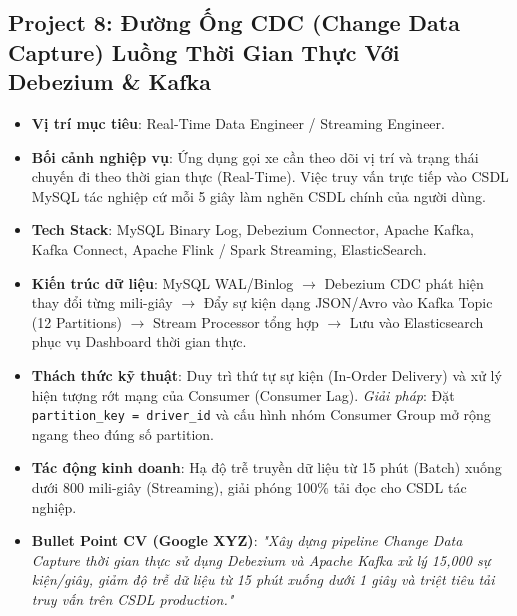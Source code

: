 \subsection{Project 8: Đường Ống CDC (Change Data Capture) Luồng Thời Gian Thực Với Debezium \& Kafka}
\begin{itemize}
    \item \textbf{Vị trí mục tiêu}: Real-Time Data Engineer / Streaming Engineer.
    \item \textbf{Bối cảnh nghiệp vụ}: Ứng dụng gọi xe cần theo dõi vị trí và trạng thái chuyến đi theo thời gian thực (Real-Time). Việc truy vấn trực tiếp vào CSDL MySQL tác nghiệp cứ mỗi 5 giây làm nghẽn CSDL chính của người dùng.
    \item \textbf{Tech Stack}: MySQL Binary Log, Debezium Connector, Apache Kafka, Kafka Connect, Apache Flink / Spark Streaming, ElasticSearch.
    \item \textbf{Kiến trúc dữ liệu}: MySQL WAL/Binlog $\rightarrow$ Debezium CDC phát hiện thay đổi từng mili-giây $\rightarrow$ Đẩy sự kiện dạng JSON/Avro vào Kafka Topic (12 Partitions) $\rightarrow$ Stream Processor tổng hợp $\rightarrow$ Lưu vào Elasticsearch phục vụ Dashboard thời gian thực.
    \item \textbf{Thách thức kỹ thuật}: Duy trì thứ tự sự kiện (In-Order Delivery) và xử lý hiện tượng rớt mạng của Consumer (Consumer Lag). \textit{Giải pháp}: Đặt \texttt{partition\_key = driver\_id} và cấu hình nhóm Consumer Group mở rộng ngang theo đúng số partition.
    \item \textbf{Tác động kinh doanh}: Hạ độ trễ truyền dữ liệu từ 15 phút (Batch) xuống dưới 800 mili-giây (Streaming), giải phóng 100\% tải đọc cho CSDL tác nghiệp.
    \item \textbf{Bullet Point CV (Google XYZ)}: \textit{"Xây dựng pipeline Change Data Capture thời gian thực sử dụng Debezium và Apache Kafka xử lý 15,000 sự kiện/giây, giảm độ trễ dữ liệu từ 15 phút xuống dưới 1 giây và triệt tiêu tải truy vấn trên CSDL production."}
\end{itemize}

